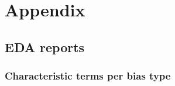 \chapter{Appendix}
\label{appendix}

\section{EDA reports}
\subsection{Characteristic terms per bias type}






